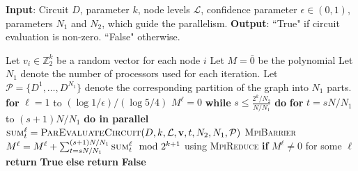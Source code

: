 \begin{algorithm}{}
\small
\caption{\parmaxwt{}$(D, k, \mathcal{L}, \epsilon, N_1, N_2)$.}
\label{alg:parallel-kMLD} 
\begin{algorithmic}[1]
\STATE \textbf{Input}: Circuit $D$, parameter $k$, node levels $\mathcal{L}$,
confidence parameter $\epsilon\in (0, 1)$, parameters $N_1$ and $N_2$, which guide the parallelism.
\STATE\textbf{Output}: ``True" if circuit evaluation is non-zero. ``False" otherwise.

\STATE Let $v_i \in \mathbb{Z}_2^k$ be a random vector for each node $i$
\STATE Let $M = \bar 0$ be the polynomial
\STATE Let $N_1$ denote the number of processors used for each iteration.
Let $\mathcal{P}=\{D^1, \ldots, D^{N_1}\}$ denote the corresponding
partition of the graph into $N_1$ parts.
\STATE \textbf{for} $\ell=1$ to $(\log{1/\epsilon})/(\log{5/4})$ 
\STATE \quad $M^{\ell}=0$
\STATE \quad \textbf{while} $s \leq \frac{2^k/N_2}{N/N_1}$ \textbf{do}
\STATE \quad \quad \textbf{for} $t =s N/N_1$ to $(s+ 1)N/N_1$ \textbf{do in parallel}
\STATE \quad \qquad  $\textsc{sum}^{\ell}_{t} = \textsc{ParEvaluateCircuit}(D, k, \mathcal{L}, \mathbf{v}, t, N_2, N_1, \mathcal{P})$
\STATE \quad \quad \textsc{MpiBarrier}
\STATE \quad \quad $M^{\ell} = M^{\ell} + \sum_{t=s N/N_1}^{(s+1)N/N_1} \textsc{sum}^{\ell}_{t} \mod 2^{k+1}$ using \textsc{MpiReduce}
\STATE \textbf{if} $M^{\ell}\neq 0$ for some $\ell$
\STATE \quad \textbf{return} \textbf{True}
\STATE \textbf{else} 
\STATE \quad \textbf{return} \textbf{False}
\end{algorithmic}
\end{algorithm}

